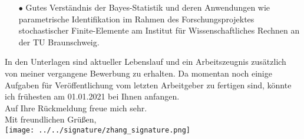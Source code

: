 \begin{adjustwidth}{0cm}{2cm}
\begin{adjustwidth}{0.5cm}{0cm}
\begin{itemize}
				\item[$\bullet$] Gutes Verständnis der Bayes-Statistik und deren Anwendungen wie parametrische Identifikation im Rahmen des Forschungsprojektes stochastischer Finite-Elemente am Institut für Wissenschaftliches Rechnen an der TU Braunschweig.\\[0em]		
   			\end{itemize}
		\end{adjustwidth}
	In den Unterlagen sind aktueller Lebenslauf und ein Arbeitszeugnis zusätzlich von meiner vergangene Bewerbung zu erhalten. Da momentan noch einige Aufgaben für Veröffentlichung vom letzten Arbeitgeber zu fertigen sind, könnte ich frühesten am 01.01.2021 bei Ihnen anfangen.\\[1em]
	Auf Ihre Rückmeldung freue mich sehr.\\[1.5em]
	Mit freundlichen Grüßen,\\[1em]
	\texttt{[image: ../../signature/zhang\_signature.png]}%
\end{adjustwidth}

